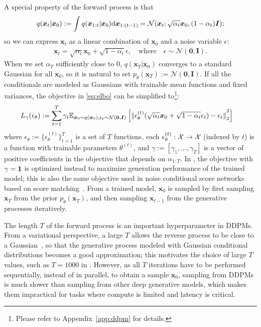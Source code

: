 A special property of the forward process is that 
$$
q(\bm{x}_t | \bm{x}_0) := \int q(\bm{x}_{1:t} | \bm{x}_0) \mathrm{d} \bm{x}_{1:(t-1)}= \mathcal{N}(\bm{x}_t; \sqrt{\alpha_t} \bm{x}_0, (1 - \alpha_t) \bm{I});
$$ 
so we can express $\bm{x}_t$ as a linear combination of $\bm{x}_0$ and a noise variable $\epsilon$:
\begin{align}
    \bm{x}_t = \sqrt{\alpha_t} \bm{x}_0 + \sqrt{1 - \alpha_t} \epsilon, \quad \text{where} \quad \epsilon \sim \mathcal{N}(\bm{0}, \bm{I}). \label{eq:reparam_xt}
\end{align}
When we set $\alpha_{T}$ sufficiently close to $0$, $q(\bm{x}_T | \bm{x}_0)$ converges to a standard Gaussian for all $\bm{x}_0$, so it is natural to set $p_\theta(\bm{x}_T) := \mathcal{N}(\bm{0}, \bm{I})$.
If all the conditionals %
are modeled as Gaussians with trainable mean functions and fixed variances, the objective in \eqref{eq:elbo} can be simplified to\footnote{Please refer to Appendix~\ref{app:ddpm} for details.}:
\begin{align}
    L_\gamma(\epsilon_\theta) & := \sum_{t=1}^{T}\gamma_t{\mathbb{E}}_{\bm{x}_0 \sim q(\bm{x}_0), \epsilon_t \sim \mathcal{N}(\bm{0}, \bm{I})}\left[  {\lVert {\epsilon_{\theta}^{(t)}(\sqrt{\alpha_t} \bm{x}_0 + \sqrt{1 - \alpha_t} \epsilon_t) - \epsilon_t} \rVert}_2^2 \right] \label{eq:l-gamma}
\end{align}
where $\epsilon_\theta := \{\epsilon_\theta^{(t)}\}_{t=1}^{T}$ is a set of $T$ functions, each $\epsilon_{\theta}^{(t)}: {\mathcal{X}} \to {\mathcal{X}}$ (indexed by $t$) is a function with trainable parameters $\theta^{(t)}$, and $\gamma := [\gamma_1, \ldots, \gamma_T]$ is a vector of positive coefficients in the objective that depends on $\alpha_{1:T}$. 
In \citet{ho2020denoising}, the objective with $\gamma = {\bm{1}}$ is optimized instead to maximize generation performance of the trained model; this is also the same objective used in noise conditional score networks~\citep{song2019generative} based on score matching~\citep{h2005estimation,vincent2011connection}. %
From a trained model, $\bm{x}_0$ is sampled by first sampling $\bm{x}_T$ from the prior $p_\theta(\bm{x}_T)$, and then sampling $\bm{x}_{t-1}$ from the generative processes iteratively. %


The length $T$ of the forward process is an important hyperparameter in DDPMs.
From a variational perspective, a large $T$ allows the reverse process to be close to a Gaussian~\citep{sohl-dickstein2015deep}, so that the generative process modeled with Gaussian conditional distributions becomes a good approximation; this motivates the choice of large $T$ values, such as $T = 1000$ in \citet{ho2020denoising}. %
However, as all $T$ iterations have to be performed sequentially, instead of in parallel, to obtain a sample $\bm{x}_0$, sampling from DDPMs is much slower than sampling from other deep generative models, which makes them impractical for tasks where compute is limited and latency is critical. %
